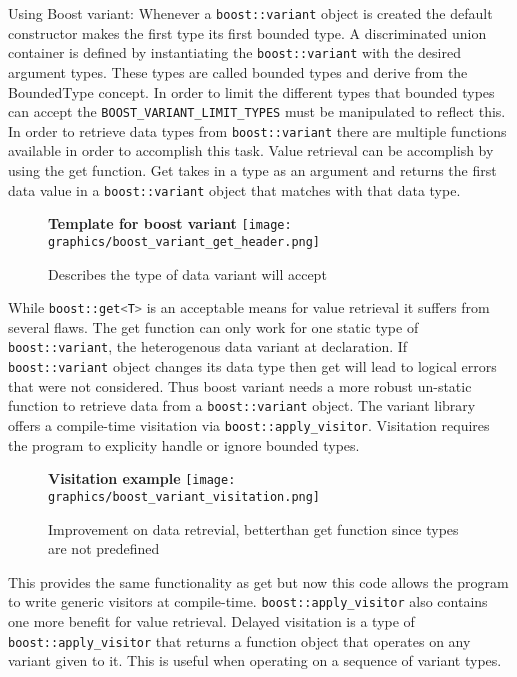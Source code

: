 \documentclass[letterpaper, 12pt]{article}
\newcommand{\inlinecode}[1]{\colorbox{codegrey}{\lstinline[language=C++]{#1}}}
\begin{document}
Using Boost variant:
Whenever a \inlinecode{boost::variant} object is created the default constructor makes the first type its first bounded type.
A discriminated union container is defined by instantiating the \inlinecode{boost::variant} with the desired argument types.
These types are called bounded types and derive from the BoundedType concept. In order to limit the different
types that bounded types can accept the \inlinecode{BOOST_VARIANT_LIMIT_TYPES} must be manipulated to reflect this.
In order to retrieve data types from \inlinecode{boost::variant} there are multiple functions available in order to accomplish this task.
Value retrieval can be accomplish by using the get function. Get takes in a type as an argument and returns the first
data value in a \inlinecode{boost::variant} object that matches with that data type.
\par\vspace{\baselineskip}
\begin{figure}
  \centering
  \textbf{Template for boost variant}
  \texttt{[image: graphics/boost\_variant\_get\_header.png]}
  \caption{Describes the type of data variant will accept}
\end{figure}

While \inlinecode{boost::get<T>} is an acceptable means for value retrieval it suffers from several flaws.
The get function can only work for one static type of \inlinecode{boost::variant},
the heterogenous data variant at declaration. If \inlinecode{boost::variant} object
changes its data type then get will lead to logical errors that were not considered.
Thus boost variant needs a more robust un-static function to retrieve
data from a \inlinecode{boost::variant} object. The variant library offers a compile-time visitation
via \inlinecode{boost::apply_visitor}. Visitation requires the program to explicity handle or ignore bounded types.
\par\vspace{\baselineskip}

\begin{figure}
  \centering
  \textbf{Visitation example}
  \texttt{[image: graphics/boost\_variant\_visitation.png]}
  \caption{Improvement on data retrevial, betterthan get function since types are not predefined}
\end{figure}

This provides the same functionality as get but now this code allows the program to write
generic visitors at compile-time. \inlinecode{boost::apply_visitor} also contains one more benefit for
value retrieval. Delayed visitation is a type of \inlinecode{boost::apply_visitor} that returns
a function object that operates on any variant given to it. This is useful when operating on a sequence of
variant types.
\par\vspace{\baselineskip}
\end{document}
